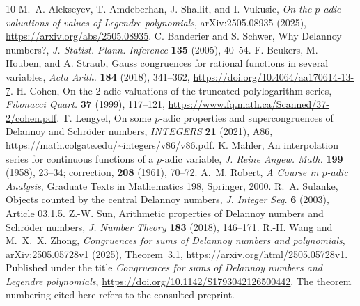 \documentclass[11pt]{article}
\theoremstyle{remark}\newtheorem{remark}[theorem]{Remark}
\begin{document}
\begin{thebibliography}{10}
\small
{}
M.~A. Alekseyev, T. Amdeberhan, J. Shallit, and I. Vukusic,
\emph{On the $p$-adic valuations of values of Legendre polynomials},
arXiv:2505.08935 (2025),
\url{https://arxiv.org/abs/2505.08935}.
C. Banderier and S. Schwer, Why Delannoy numbers?,
\emph{J. Statist. Plann. Inference} \textbf{135} (2005), 40--54.
F. Beukers, M. Houben, and A. Straub,
Gauss congruences for rational functions in several variables,
\emph{Acta Arith.} \textbf{184} (2018), 341--362,
\url{https://doi.org/10.4064/aa170614-13-7}.
H. Cohen, On the $2$-adic valuations of the truncated polylogarithm series,
\emph{Fibonacci Quart.} \textbf{37} (1999), 117--121,
\url{https://www.fq.math.ca/Scanned/37-2/cohen.pdf}.
T. Lengyel, On some $p$-adic properties and supercongruences of Delannoy
and Schr\"oder numbers, \emph{INTEGERS} \textbf{21} (2021), A86,
\url{https://math.colgate.edu/~integers/v86/v86.pdf}.
K. Mahler, An interpolation series for continuous functions of a $p$-adic
variable, \emph{J. Reine Angew. Math.} \textbf{199} (1958), 23--34;
correction, \textbf{208} (1961), 70--72.
A.~M. Robert, \emph{A Course in $p$-adic Analysis},
Graduate Texts in Mathematics 198, Springer, 2000.
R.~A. Sulanke, Objects counted by the central Delannoy numbers,
\emph{J. Integer Seq.} \textbf{6} (2003), Article 03.1.5.
Z.-W. Sun, Arithmetic properties of Delannoy numbers and Schr\"oder numbers,
\emph{J. Number Theory} \textbf{183} (2018), 146--171.
R.-H. Wang and M.~X.~X. Zhong,
\emph{Congruences for sums of Delannoy numbers and polynomials},
arXiv:2505.05728v1 (2025), Theorem~3.1,
\url{https://arxiv.org/html/2505.05728v1}.
Published under the title \emph{Congruences for sums of Delannoy numbers
and Legendre polynomials}, \url{https://doi.org/10.1142/S1793042126500442}.
The theorem numbering cited here refers to the consulted preprint.
\end{thebibliography}
\end{document}
